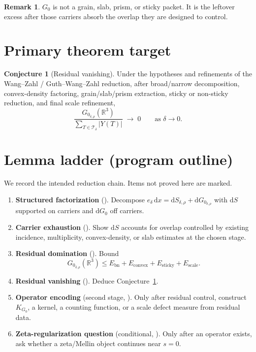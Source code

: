 \documentclass[11pt]{amsart}
\theoremstyle{plain}
\theoremstyle{definition}
\newtheorem{remark}[theorem]{Remark}
\newtheorem{conjecture}[theorem]{Conjecture}
\newcommand{\dd}{\mathrm{d}}
\newcommand{\Gzero}{G_0}
\newcommand{\Tdelta}{\mathcal{T}_\delta}
\newcommand{\edelta}{e_\delta}
\begin{document}
\begin{remark}
$\Gzero$ is not a grain, slab, prism, or sticky packet. It is the leftover
excess after those carriers absorb the overlap they are designed to control.
\end{remark}

\section{Primary theorem target}

\begin{conjecture}[Residual vanishing]
\label{conj:vanish}
Under the hypotheses and refinements of the Wang--Zahl /
Guth--Wang--Zahl reduction, after broad/narrow decomposition, convex-density
factoring, grain/slab/prism extraction, sticky or non-sticky reduction, and
final scale refinement,
\begin{equation}
  \frac{\Gzero_{\delta,\rho}(\mathbb{R}^3)}
       {\sum_{T\in\Tdelta} |Y(T)|}
  \;\longrightarrow\; 0
  \qquad\text{as }\delta\to 0.
\end{equation}
\end{conjecture}


\section{Lemma ladder (program outline)}

We record the intended reduction chain. Items not proved here are marked.

\begin{enumerate}[label=\textbf{L\arabic*.},leftmargin=*]
  \item \textbf{Structured factorization} (\PeAIceProposed).
  Decompose $\edelta\,\dd x = \dd S_{\delta,\rho} + \dd \Gzero_{\delta,\rho}$
  with $\dd S$ supported on carriers and $\dd \Gzero$ off carriers.
  \item \textbf{Carrier exhaustion} (\PeAIceProposed).
  Show $\dd S$ accounts for overlap controlled by existing incidence,
  multiplicity, convex-density, or slab estimates at the chosen stage.
  \item \textbf{Residual domination} (\PeAIceProposed).
  Bound
  \[
    \Gzero_{\delta,\rho}(\mathbb{R}^3)
    \le
    E_{\mathrm{bn}} + E_{\mathrm{convex}} + E_{\mathrm{sticky}} + E_{\mathrm{scale}}.
  \]
  \item \textbf{Residual vanishing} (\PeAIceOpen).
  Deduce Conjecture~\ref{conj:vanish}.
  \item \textbf{Operator encoding} (second stage, \PeAIceOpen).
  Only after residual control, construct $K_{\Gzero}$, a kernel, a counting
  function, or a scale defect measure from residual data.
  \item \textbf{Zeta-regularization question} (conditional, \PeAIceOpen).
  Only after an operator exists, ask whether a zeta/Mellin object continues
  near $s=0$. \ZetaFirewall
\end{enumerate}
\end{document}
